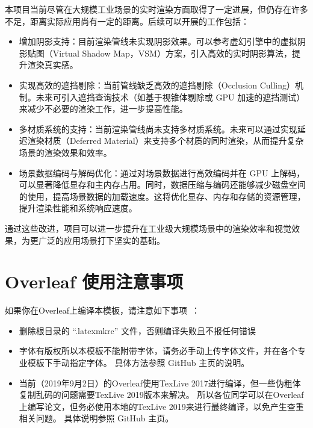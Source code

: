 本项目当前尽管在大规模工业场景的实时渲染方面取得了一定进展，但仍存在许多不足，距离实际应用尚有一定的距离。后续可以开展的工作包括：

\begin{itemize}
    \item 增加阴影支持：目前渲染管线未实现阴影效果。可以参考虚幻引擎中的虚拟阴影贴图（Virtual Shadow Map，VSM）方案，引入高效的实时阴影算法，提升渲染真实感。

    \item 实现高效的遮挡剔除：当前管线缺乏高效的遮挡剔除（Occlusion Culling）机制。未来可引入遮挡查询技术（如基于视锥体剔除或 GPU 加速的遮挡测试）来减少不必要的渲染工作，进一步提高性能。

    \item 多材质系统的支持：当前渲染管线尚未支持多材质系统。未来可以通过实现延迟渲染材质（Deferred Material）来支持多个材质的同时渲染，从而提升复杂场景的渲染效果和效率。

    \item 场景数据编码与解码优化：通过对场景数据进行高效编码并在 GPU 上解码，可以显著降低显存和主内存占用。同时，数据压缩与编码还能够减少磁盘空间的使用，提高场景数据的加载速度。这将优化显存、内存和存储的资源管理，提升渲染性能和系统响应速度。
\end{itemize}

通过这些改进，项目可以进一步提升在工业级大规模场景中的渲染效率和视觉效果，为更广泛的应用场景打下坚实的基础。

\section{Overleaf 使用注意事项}

如果你在Overleaf上编译本模板，请注意如下事项~\cite{zjuthesis}：

\begin{itemize}
    \item 删除根目录的 ``.latexmkrc'' 文件，否则编译失败且不报任何错误
    \item 字体有版权所以本模板不能附带字体，请务必手动上传字体文件，并在各个专业模板下手动指定字体。
        具体方法参照 GitHub 主页的说明。
    \item 当前（2019年9月2日）的Overleaf使用TexLive 2017进行编译，但一些伪粗体复制乱码的问题需要TexLive 2019版本来解决。
        所以各位同学可以在Overleaf上编写论文，但务必使用本地的TexLive 2019来进行最终编译，以免产生查重相关问题。
        具体说明参照 GitHub 主页。
\end{itemize}

